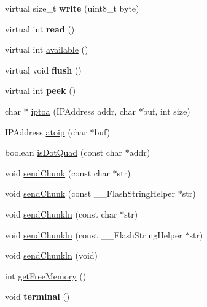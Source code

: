 \begin{DoxyCompactItemize}
\item 
\hypertarget{class_wi_fly_a5a20b7e512452efe430e67fc97f8a190}{
virtual size\-\_\-t {\bfseries write} (uint8\-\_\-t byte)}
\label{class_wi_fly_a5a20b7e512452efe430e67fc97f8a190}

\item 
\hypertarget{class_wi_fly_a5dbfebf6ebdce4276f8b0d5cacf98317}{
virtual int {\bfseries read} ()}
\label{class_wi_fly_a5dbfebf6ebdce4276f8b0d5cacf98317}

\item 
virtual int \hyperlink{class_wi_fly_a3babea7066b250401d82afbfb6f52432}{available} ()
\item 
\hypertarget{class_wi_fly_a94e0af506d51d6f2b6f352bba8256ad4}{
virtual void {\bfseries flush} ()}
\label{class_wi_fly_a94e0af506d51d6f2b6f352bba8256ad4}

\item 
\hypertarget{class_wi_fly_a5d49f52b6340f5217460f135ce6de445}{
virtual int {\bfseries peek} ()}
\label{class_wi_fly_a5d49f52b6340f5217460f135ce6de445}

\item 
char $\ast$ \hyperlink{class_wi_fly_ae07a90b6e1deee53de6686696152b7b5}{iptoa} (\-I\-P\-Address addr, char $\ast$buf, int size)
\item 
\-I\-P\-Address \hyperlink{class_wi_fly_a00f0a87632d12230861b45acb243094d}{atoip} (char $\ast$buf)
\item 
boolean \hyperlink{class_wi_fly_a3fbcf8315dea83ef0b8215a9255b4d08}{is\-Dot\-Quad} (const char $\ast$addr)
\item 
void \hyperlink{class_wi_fly_a45a7b120975fe4374baceef7cd63c215}{send\-Chunk} (const char $\ast$str)
\item 
void \hyperlink{class_wi_fly_ab4b056adb910a69c94fdaa55df1bf670}{send\-Chunk} (const \-\_\-\-\_\-\-Flash\-String\-Helper $\ast$str)
\item 
void \hyperlink{class_wi_fly_a5525a237b597251c665cb7af250a82af}{send\-Chunkln} (const char $\ast$str)
\item 
void \hyperlink{class_wi_fly_a9aa38ac22106b29abb5314d3acf5fa50}{send\-Chunkln} (const \-\_\-\-\_\-\-Flash\-String\-Helper $\ast$str)
\item 
void \hyperlink{class_wi_fly_a273335cd3b1dc955cd1eafc918f3a714}{send\-Chunkln} (void)
\item 
int \hyperlink{class_wi_fly_a7988965adc898268d2eb52548f38c673}{get\-Free\-Memory} ()
\item 
\hypertarget{class_wi_fly_af607bded1fb1f4b6fdf994b2b1b9d45f}{
void {\bfseries terminal} ()}
\label{class_wi_fly_af607bded1fb1f4b6fdf994b2b1b9d45f}


\end{DoxyCompactItemize}
